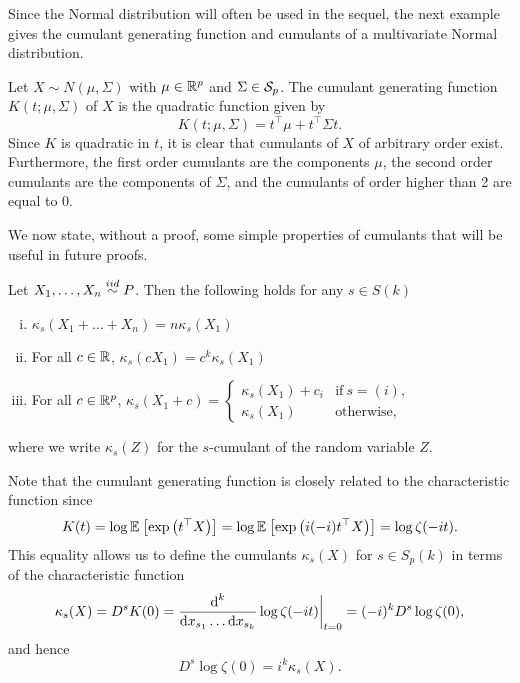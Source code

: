 Since the Normal distribution will often be used in the sequel, the next example gives the cumulant generating function and cumulants of a multivariate Normal distribution.
\begin{example} \label{ex-cumulants-mvn}
    Let $X \sim N(\mu, \Sigma)$ with $\mu \in {\mathbb{R}^p}$ and $\Sigma \in {\mathcal{S}_p}$. The cumulant generating function $K(t; \mu, \Sigma)$ of $X$ is the quadratic function given by
    \begin{equation*}
        K(t; \mu, \Sigma) = t^\top\mu + t^\top\Sigma t.
    \end{equation*}
    Since $K$ is quadratic in $t$, it is clear that cumulants of $X$ of arbitrary order exist. Furthermore, the first order cumulants are the components $\mu$, the second order cumulants are the components of $\Sigma$, and the cumulants of order higher than 2 are equal to 0.
\end{example}

We now state, without a proof, some simple properties of cumulants that will be useful in future proofs.
\begin{lemma} \label{lem-cumulants-props}
    Let $X_1, \ldots, X_n \stackrel{iid}{\sim} P$. Then the following holds for any $s \in S(k)$
    \begin{enumerate}[i.]
        \item {
        $\kappa_s(X_1 + \ldots + X_n) = n\kappa_s(X_1)$
        }
        \item {
            For all $c \in \mathbb{R}$, $\kappa_s(c X_1) = c^k\kappa_s(X_1)$
        }
        \item {
            For all $c \in {\mathbb{R}^p}$, $\kappa_s(X_1 + c) =
            \begin{cases}
                \kappa_s(X_1) + c_i &\text{if}\ s=(i),\\
                \kappa_s(X_1)& \text{otherwise},
            \end{cases}$
        }
    \end{enumerate}
    where we write $\kappa_s(Z)$ for the $s$-cumulant of the random variable $Z$.
\end{lemma}

Note that the cumulant generating function is closely related to the characteristic function since
\begin{equation*}
    K(t) 
    = \log \mathbb{E}_{}\left[\exp\left(t^\top X\right)\right] 
    = \log \mathbb{E}_{}\left[\exp\left(i (-i)t^\top X\right)\right]
    = \log \zeta(-it).
\end{equation*}
This equality allows us to define the cumulants $\kappa_s(X)$ for $s \in S_p(k)$ in terms of the characteristic function
\begin{equation*}
    \kappa_s(X) = D^s K(0) 
    = \frac{\text{d}^k}{\text{d} x_{s_1} \ldots \text{d} x_{s_k}} \log \zeta(-it) \bigg|_{t=0}
    = (-i)^{k} D^s \log \zeta(0),
\end{equation*}
and hence
\begin{equation*}
    D^s \log \zeta(0) = i^k \kappa_s(X).
\end{equation*}